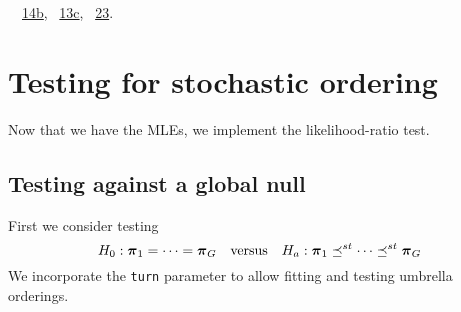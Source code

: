 \documentclass[reqno]{amsart}
\renewcommand{\NWlink}[2]{\hyperlink{#1}{#2}}
\newcommand{\bpi}{\text{\boldmath $\pi$}}
\newcommand{\leqst}{\mathrel{\preceq^{st}}}
\begin{document}
\begin{flushleft}
\begin{list}{}{\setlength{\itemsep}{-\parsep}\setlength{\itemindent}{-\leftmargin}}
\item \NWtxtIdentsUsed\nobreak\  \verb@CalcMarginals@\nobreak\ \NWlink{nuweb14b}{14b}, \verb@HyperTable@\nobreak\ \NWlink{nuweb13c}{13c}, \verb@UpdateReprodQ@\nobreak\ \NWlink{nuweb23}{23}.
\item{}
\end{list}
\vspace{4ex}
\end{flushleft}
\section{Testing for stochastic ordering}

Now that we have the MLEs, we implement the likelihood-ratio test. 

\subsection{Testing against a global null}
First  we consider testing
\begin{equation*}
H_0: \bpi_1=\cdots =\bpi_G \quad\text{versus}\quad
H_a:\bpi_1 \leqst \cdots \leqst \bpi_G
\end{equation*}
We incorporate the \texttt{turn} parameter to allow fitting and testing umbrella orderings.
\end{document}
